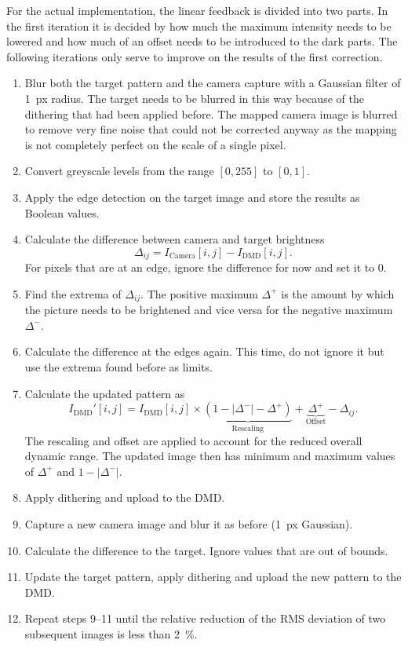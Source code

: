 For the actual implementation, the linear feedback is divided into two parts. In the first iteration it is decided by how much the maximum intensity needs to be lowered and how much of an offset needs to be introduced to the dark parts. The following iterations only serve to improve on the results of the first correction.
%
\begin{enumerate}
    \item Blur both the target pattern and the camera capture with a Gaussian filter of \SI{1}{px} radius. The target needs to be blurred in this way because of the dithering that had been applied before. The mapped camera image is blurred to remove very fine noise that could not be corrected anyway as the mapping is not completely perfect on the scale of a single pixel.
    \item Convert greyscale levels from the range $[0,255]$ to $[0,1]$.
    \item Apply the edge detection on the target image and store the results as Boolean values.
    \item Calculate the difference between camera and target brightness \[\Delta_{ij} = I_\text{Camera}[i,j] - I_\text{DMD}[i,j].\] For pixels that are at an edge, ignore the difference for now and set it to 0.
    \item Find the extrema of $\Delta_{ij}$. The positive maximum $\Delta^+$ is the amount by which the picture needs to be brightened and vice versa for the negative maximum $\Delta^-$. 
    \item Calculate the difference at the edges again. This time, do not ignore it but use the extrema found before as limits.
    \item Calculate the updated pattern as \[I_\text{DMD}'[i,j] = I_\text{DMD}[i,j]\times \underbrace{(1- | \Delta^- | - \Delta^+)}_{\text{Rescaling}} + \underbrace{\Delta^+}_{\text{Offset}} - \Delta_{ij}. \] The rescaling and offset are applied to account for the reduced overall dynamic range. The updated image then has minimum and maximum values of $\Delta^+$ and $1 - |\Delta^-|$.
    \item Apply dithering and upload to the DMD.
    \item Capture a new camera image and blur it as before (\SI{1}{px} Gaussian).
    \item Calculate the difference to the target. Ignore values that are out of bounds.
    \item Update the target pattern, apply dithering and upload the new pattern to the DMD.
    \item Repeat steps 9--11 until the relative reduction of the RMS deviation of two subsequent images is less than \SI{2}{\percent}.
\end{enumerate}
